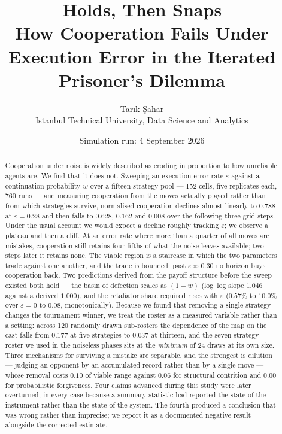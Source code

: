 \documentclass[11pt,a4paper]{article}
\title{\bfseries Holds, Then Snaps\\[0.3em]
\large How Cooperation Fails Under Execution Error in the Iterated
Prisoner's Dilemma}
\author{Tar\i k \c{S}ahar\\[0.2em]
\small Istanbul Technical University, Data Science and Analytics}
\date{Simulation run: 4 September 2026}
\newcommand{\eps}{\varepsilon}
\begin{document}
\maketitle

\begin{abstract}
\noindent
Cooperation under noise is widely described as eroding in proportion to how
unreliable agents are. We find that it does not. Sweeping an execution error
rate $\eps$
against a continuation probability $w$ over a fifteen-strategy pool --- 152
cells, five replicates each, 760 runs --- and measuring cooperation from the moves
actually played rather than from which strategies survive, normalised
cooperation declines almost linearly to $\mathbf{0.788}$ at $\eps = 0.28$ and
then falls to $\mathbf{0.628}$, $\mathbf{0.162}$ and $0.008$ over the following
three grid steps. Under the usual account we would expect a decline roughly
tracking $\eps$; we observe a plateau and then a cliff. At an error rate where
more than a quarter of all moves are mistakes, cooperation still retains four
fifths of what the noise leaves available; two steps later it retains none. The viable region is a staircase in which the two parameters trade
against one another, and the trade is bounded: past $\eps \approx 0.30$ no
horizon buys cooperation back. Two predictions derived from the payoff structure
before the sweep existed both hold --- the basin of defection scales as $(1-w)$
(log--log slope $1.046$ against a derived $1.000$), and the retaliator share
required rises with $\eps$ ($0.57\%$ to $10.0\%$ over $\eps = 0$ to $0.08$,
monotonically). Because we found that removing a single strategy changes the
tournament winner, we treat the roster as a measured variable rather than a
setting: across 120 randomly drawn sub-rosters the dependence of the map on the
cast falls from $\mathbf{0.177}$ at five strategies to $\mathbf{0.037}$ at
thirteen, and the seven-strategy roster we used in the noiseless phases sits at
the \emph{minimum} of 24 draws at its own size. Three mechanisms for surviving a mistake are separable,
and the strongest is dilution --- judging an opponent by an accumulated record
rather than by a single move --- whose removal costs $0.10$ of viable range
against $0.06$ for structural contrition and $0.00$ for probabilistic
forgiveness. Four claims advanced during this study were later overturned, in every case
because a summary statistic had reported the state of the instrument rather than
the state of the system. The fourth produced a conclusion that was wrong rather
than imprecise; we report it as a documented negative result alongside the
corrected estimate.
\end{abstract}
\end{document}
